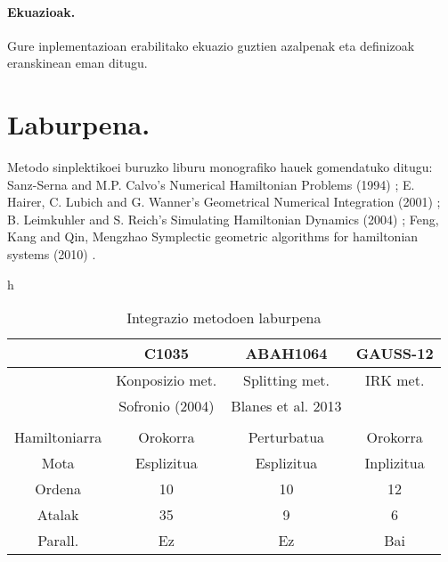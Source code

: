 \paragraph*{\textbf{Ekuazioak}.} Gure inplementazioan erabilitako ekuazio guztien azalpenak eta definizoak eranskinean eman ditugu.

\section{Laburpena.}

Metodo sinplektikoei buruzko liburu monografiko hauek gomendatuko ditugu: Sanz-Serna and M.P. Calvo’s Numerical Hamiltonian Problems (1994) \cite{JMSanz-Serna1994}; E. Hairer, C. Lubich and G. Wanner’s Geometrical Numerical Integration (2001) \cite{Hairer2006}; B. Leimkuhler and S. Reich’s Simulating Hamiltonian Dynamics (2004) \cite{Leimkuhler2004}; Feng, Kang and Qin, Mengzhao  Symplectic geometric algorithms for hamiltonian systems (2010) \cite{Feng2010}.


\begin{table}{h}
\caption{Integrazio metodoen laburpena}
\label{tab:1}       %
\begin{tabular}{ c|c c c } 
           &  C1035             &  ABAH1064           & GAUSS-12           \\
 \hline
 	       & Konposizio met.    & Splitting met.     & IRK met.            \\
 	       & Sofronio (2004)    & Blanes et al. 2013 &                     \\
 \hline 
               &                    &                    &                 \\
 Hamiltoniarra & Orokorra           & Perturbatua        & Orokorra        \\ 	    
 Mota          & Esplizitua         & Esplizitua         & Inplizitua      \\ 
 Ordena        & 10                 & 10                 & 12              \\ 
 Atalak        & 35                 & 9                  & 6               \\ 
 Parall.       & Ez                 & Ez                 & Bai             \\  
\end{tabular}
\end{table}
 
